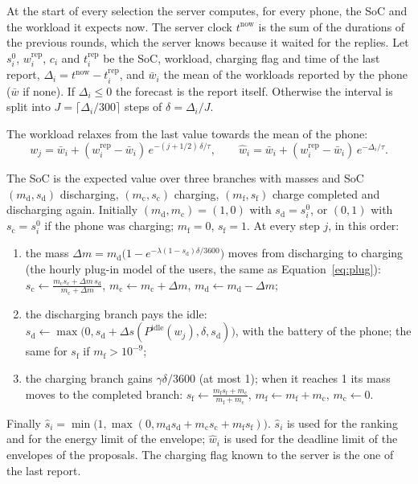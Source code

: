 \documentclass[11pt,a4paper]{article}
\begin{document}
At the start of every selection the server computes, for every phone, the SoC
and the workload it expects now. The server clock $t^{\mathrm{now}}$ is the sum
of the durations of the previous rounds, which the server knows because it
waited for the replies. Let $s^{0}_i$, $w^{\mathrm{rep}}_i$, $c_i$ and
$t^{\mathrm{rep}}_i$ be the SoC, workload, charging flag and time of the last
report, $\Delta_i = t^{\mathrm{now}} - t^{\mathrm{rep}}_i$, and $\bar{w}_i$ the
mean of the workloads reported by the phone ($\bar{w}$ if none). If
$\Delta_i \le 0$ the forecast is the report itself. Otherwise the interval is
split into $J = \lceil \Delta_i / 300 \rceil$ steps of $\delta = \Delta_i / J$.

The workload relaxes from the last value towards the mean of the phone:
\begin{equation}
  w_j = \bar{w}_i + (w^{\mathrm{rep}}_i - \bar{w}_i)\, e^{-(j + 1/2)\,\delta / \tau},
  \qquad
  \hat{w}_i = \bar{w}_i + (w^{\mathrm{rep}}_i - \bar{w}_i)\, e^{-\Delta_i / \tau} .
\end{equation}

The SoC is the expected value over three branches with masses and SoC
$(m_{\mathrm{d}}, s_{\mathrm{d}})$ discharging, $(m_{\mathrm{c}},
s_{\mathrm{c}})$ charging, $(m_{\mathrm{f}}, s_{\mathrm{f}})$ charge completed
and discharging again. Initially $(m_{\mathrm{d}}, m_{\mathrm{c}}) = (1, 0)$
with $s_{\mathrm{d}} = s^0_i$, or $(0, 1)$ with $s_{\mathrm{c}} = s^0_i$ if the
phone was charging; $m_{\mathrm{f}} = 0$, $s_{\mathrm{f}} = 1$. At every step
$j$, in this order:
\begin{enumerate}
  \item the mass $\Delta m = m_{\mathrm{d}} \bigl(1 - e^{-\lambda (1 -
        s_{\mathrm{d}}) \delta / 3600}\bigr)$ moves from discharging to
        charging (the hourly plug-in model of the users, the same as
        Equation~\eqref{eq:plug}):
        $s_{\mathrm{c}} \leftarrow \frac{m_{\mathrm{c}} s_{\mathrm{c}} + \Delta m \, s_{\mathrm{d}}}{m_{\mathrm{c}} + \Delta m}$,
        $m_{\mathrm{c}} \leftarrow m_{\mathrm{c}} + \Delta m$,
        $m_{\mathrm{d}} \leftarrow m_{\mathrm{d}} - \Delta m$;
  \item the discharging branch pays the idle:
        $s_{\mathrm{d}} \leftarrow \max\bigl(0, s_{\mathrm{d}} + \Delta s(P^{\mathrm{idle}}(w_j), \delta, s_{\mathrm{d}})\bigr)$,
        with the battery of the phone; the same for $s_{\mathrm{f}}$ if
        $m_{\mathrm{f}} > 10^{-9}$;
  \item the charging branch gains $\gamma \delta / 3600$ (at most 1); when it
        reaches 1 its mass moves to the completed branch:
        $s_{\mathrm{f}} \leftarrow \frac{m_{\mathrm{f}} s_{\mathrm{f}} + m_{\mathrm{c}}}{m_{\mathrm{f}} + m_{\mathrm{c}}}$,
        $m_{\mathrm{f}} \leftarrow m_{\mathrm{f}} + m_{\mathrm{c}}$, $m_{\mathrm{c}} \leftarrow 0$.
\end{enumerate}
Finally $\hat{s}_i = \min\bigl(1, \max(0, m_{\mathrm{d}} s_{\mathrm{d}} +
m_{\mathrm{c}} s_{\mathrm{c}} + m_{\mathrm{f}} s_{\mathrm{f}})\bigr)$.
$\hat{s}_i$ is used for the ranking and for the energy limit of the envelope;
$\hat{w}_i$ is used for the deadline limit of the envelopes of the proposals.
The charging flag known to the server is the one of the last report.
\end{document}
